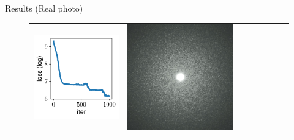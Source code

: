 \documentclass[final]{beamer}
\newlength{\twocolwid}
\newlength{\resultwidth}
\begin{document}
\begin{frame}[t]
\begin{columns}[t]
\begin{column}{\twocolwid}
\begin{block}{Results (Real photo)}
\begin{figure}[t]
\begin{tabular}{ccrclccc}
            		\includegraphics[width=\resultwidth]{real/flake/loss.pdf} &
            		\includegraphics[width=\resultwidth]{real/flake/optim.jpg} &

\end{tabular}
\end{figure}
\end{block}
\end{column}
\end{columns}
\end{frame}
\end{document}
